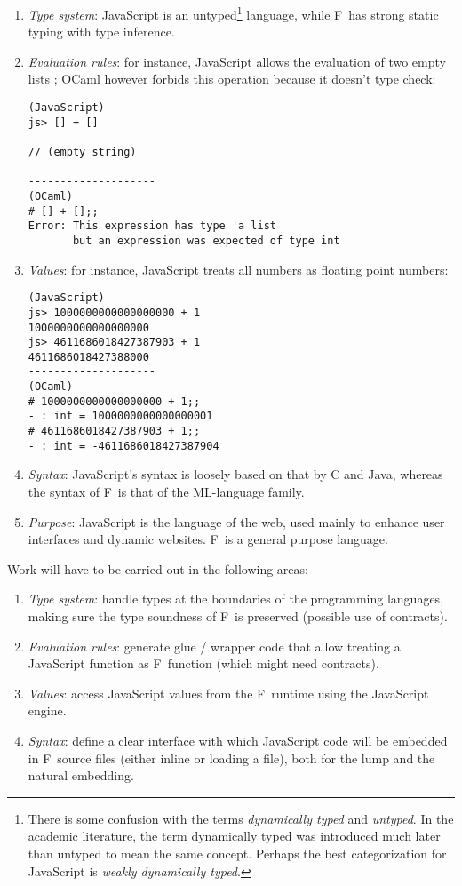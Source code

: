 \documentclass[12pt,a4paper]{article} \usepackage{a4wide}
\newcommand{\fs}{F\nolinebreak\hspace{-.05em}\raisebox{.6ex}{\tiny\bf
    \#}}
\begin{document}
\begin{enumerate}
\item \emph{Type system}: JavaScript is an untyped\footnote{There is some
    confusion with the terms \emph{dynamically typed} and
    \emph{untyped}. In the academic literature, the term dynamically typed
    was introduced much later than untyped to mean the same
    concept. Perhaps the best categorization for JavaScript is \emph{weakly dynamically typed}.}
  language, while \fs\ has strong static typing with type inference.
\item \emph{Evaluation rules}: for instance, JavaScript allows the evaluation of two empty lists \cite{ECMA-262}; OCaml however forbids this operation because it doesn't type check:
\begin{verbatim}
(JavaScript)
js> [] + []

// (empty string)

--------------------
(OCaml)
# [] + [];;
Error: This expression has type 'a list
       but an expression was expected of type int
\end{verbatim}

\item \emph{Values}: for instance, JavaScript treats all numbers as floating point numbers:
\begin{verbatim}
(JavaScript)
js> 1000000000000000000 + 1
1000000000000000000
js> 4611686018427387903 + 1
4611686018427388000
--------------------
(OCaml)
# 1000000000000000000 + 1;;
- : int = 1000000000000000001
# 4611686018427387903 + 1;;
- : int = -4611686018427387904
\end{verbatim}
\item \emph{Syntax}: JavaScript's syntax is loosely based on that by C and Java, whereas the syntax of \fs\ is that of the ML-language family.
\item \emph{Purpose}: JavaScript is the language of the web, used mainly to enhance user interfaces and dynamic websites. \fs\ is a general purpose language.

\end{enumerate}

Work will have to be carried out in the following areas:
\begin{enumerate}

\item \emph{Type system}: handle types at the boundaries of the programming languages,
  making sure the type soundness of \fs\ is preserved (possible use of
  contracts).

\item \emph{Evaluation rules}: generate glue / wrapper code that allow treating a JavaScript function as \fs\ function (which might need contracts).

\item \emph{Values}: access JavaScript values from the \fs\ runtime using the
  JavaScript engine.

\item \emph{Syntax}: define a clear interface with which JavaScript code will be
  embedded in \fs\ source files (either inline or loading a file), both
  for the lump and the natural embedding.


\end{enumerate}
\end{document}
